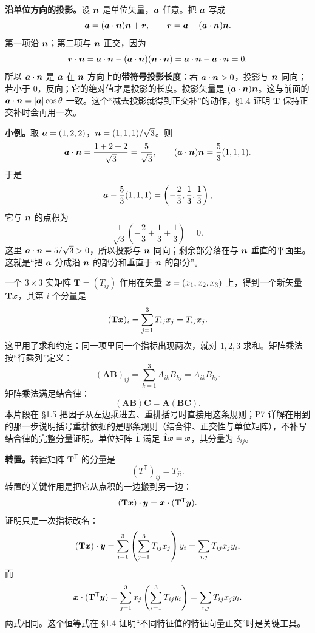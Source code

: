 \documentclass[11pt]{ctexart}
\newcommand{\ten}[1]{\mathbf{#1}}
\newcommand{\unitd}{\hat{\ten{1}}}
\let\origsubhdr\subhdr
\renewcommand{\subhdr}[1]{\par\needspace{3\baselineskip}\origsubhdr{#1}}
\begin{document}
\textbf{沿单位方向的投影。}设 $\boldsymbol{n}$ 是单位矢量，$\boldsymbol{a}$ 任意。把 $\boldsymbol{a}$ 写成
\[
\boldsymbol{a}=(\boldsymbol{a}\cdot\boldsymbol{n})\boldsymbol{n}+\boldsymbol{r},
\qquad
\boldsymbol{r}=\boldsymbol{a}-(\boldsymbol{a}\cdot\boldsymbol{n})\boldsymbol{n} .
\]
第一项沿 $\boldsymbol{n}$；第二项与 $\boldsymbol{n}$ 正交，因为
\[
\boldsymbol{r}\cdot\boldsymbol{n}
=\boldsymbol{a}\cdot\boldsymbol{n}-(\boldsymbol{a}\cdot\boldsymbol{n})(\boldsymbol{n}\cdot\boldsymbol{n})
=\boldsymbol{a}\cdot\boldsymbol{n}-\boldsymbol{a}\cdot\boldsymbol{n}=0 .
\]
所以 $\boldsymbol{a}\cdot\boldsymbol{n}$ 是 $\boldsymbol{a}$ 在 $\boldsymbol{n}$ 方向上的\textbf{带符号投影长度}：若 $\boldsymbol{a}\cdot\boldsymbol{n}>0$，投影与 $\boldsymbol{n}$ 同向；若小于 $0$，反向；它的绝对值才是投影的长度。投影矢量是 $(\boldsymbol{a}\cdot\boldsymbol{n})\boldsymbol{n}$。这与前面的 $\boldsymbol{a}\cdot\boldsymbol{n}=|\boldsymbol{a}|\cos\theta$ 一致。这个“减去投影就得到正交补”的动作，§1.4 证明 $\ten T$ 保持正交补时会再用一次。

\textbf{小例。}取 $\boldsymbol{a}=(1,2,2)$，$\boldsymbol{n}=(1,1,1)/\sqrt3$。则
\[
\boldsymbol{a}\cdot\boldsymbol{n}=\frac{1+2+2}{\sqrt3}=\frac{5}{\sqrt3},
\qquad
(\boldsymbol{a}\cdot\boldsymbol{n})\boldsymbol{n}=\frac53(1,1,1).
\]
于是
\[
\boldsymbol{a}-\frac53(1,1,1)=\left(-\frac23,\frac13,\frac13\right),
\]
它与 $\boldsymbol{n}$ 的点积为
\[
\frac{1}{\sqrt3}\left(-\frac23+\frac13+\frac13\right)=0 .
\]
这里 $\boldsymbol{a}\cdot\boldsymbol{n}=5/\sqrt3>0$，所以投影与 $\boldsymbol{n}$ 同向；剩余部分落在与 $\boldsymbol{n}$ 垂直的平面里。这就是“把 $\boldsymbol{a}$ 分成沿 $\boldsymbol{n}$ 的部分和垂直于 $\boldsymbol{n}$ 的部分”。


一个 $3\times3$ 实矩阵 $\ten T=(T_{ij})$ 作用在矢量 $\boldsymbol{x}=(x_1,x_2,x_3)$ 上，得到一个新矢量 $\ten T\vect x$，其第 $i$ 个分量是
\[
(\ten T\vect x)_i=\sum_{j=1}^{3}T_{ij}x_j=T_{ij}x_j .
\]
这里用了求和约定：同一项里同一个指标出现两次，就对 $1,2,3$ 求和。矩阵乘法按“行乘列”定义：
\[
(\ten A\ten B)_{ij}=\sum_{k=1}^{3}A_{ik}B_{kj}=A_{ik}B_{kj}.
\]
矩阵乘法满足结合律：
\[
(\ten A\ten B)\ten C=\ten A(\ten B\ten C).
\]
本片段在 §1.5 把因子从左边乘进去、重排括号时直接用这条规则；P7 详解在用到的那一步说明括号重排依据的是哪条规则（结合律、正交性与单位矩阵），不补写结合律的完整分量证明。单位矩阵 $\unitd$ 满足 $\unitd\vect x=\vect x$，其分量为 $\delta_{ij}$。

\textbf{转置。}转置矩阵 $\ten T^{\mathsf T}$ 的分量是
\[
(T^{\mathsf T})_{ij}=T_{ji}.
\]
转置的关键作用是把它从点积的一边搬到另一边：
\[
(\ten T\vect x)\cdot\vect y=\vect x\cdot(\ten T^{\mathsf T}\vect y).
\]
证明只是一次指标改名：
\[
(\ten T\vect x)\cdot\vect y
=\sum_{i=1}^{3}\left(\sum_{j=1}^{3}T_{ij}x_j\right)y_i
=\sum_{i,j}T_{ij}x_jy_i,
\]
而
\[
\vect x\cdot(\ten T^{\mathsf T}\vect y)
=\sum_{j=1}^{3}x_j\left(\sum_{i=1}^{3}T_{ij}y_i\right)
=\sum_{i,j}T_{ij}x_jy_i .
\]
两式相同。这个恒等式在 §1.4 证明“不同特征值的特征向量正交”时是关键工具。
\end{document}
